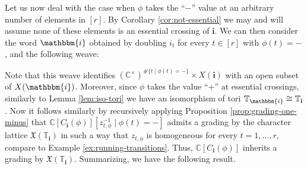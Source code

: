 \documentclass[a4paper, 11pt]{amsart}
\newcommand{\charlat}{\mathfrak{X}}
\newcommand{\word}[1]{\mathbf{#1}}
\newcommand{\wword}[1]{\mathbbm{#1}}
\newcommand{\C}{\mathbb{C}}
\newcommand{\dil}[1]{\mathbb{T}_{#1}}
\theoremstyle{definition}
\begin{document}
Let us now deal with the case when $\phi$ takes the ``$-$'' value at an arbitrary number of elements in $[r]$. By Corollary \ref{cor:not-essential} we may and will assume none of these elements is an essential crossing of $\word{i}$. We can then consider the word $\wword{i}$ obtained by doubling $i_t$ for every $t \in [r]$ with $\phi(t) = -$, and the following weave:

\begin{center}
\end{center}

Note that this weave identifies $(\C^{\times})^{\#\{t \mid \phi(t) = -\}} \times X(\word{i})$ with an open subset of $X(\wword{i})$. Moreover, since $\phi$ takes the value ``$+$'' at essential crossings, similarly to Lemma \ref{lem:iso-tori} we have an isomorphism of tori $\dil{\wword{i}} \cong \dil{\word{i}}$. Now it follows similarly by recursively applying Proposition \ref{prop:grading-one-minus} that $\C[C_{\word{i}}(\phi)][z_{t, \phi}^{-1} \mid \phi(t) = -]$ admits a grading by the character lattice $\charlat(\dil{\word{i}})$ in such a way that $z_{t, \phi}$ is homogeneous for every $t = 1, \dots, r$, compare to Example \ref{ex:running-transitions}. Thus, $\C[C_{\word{i}}(\phi)]$ inherits a grading by $\charlat(\dil{\word{i}})$. Summarizing, we have the following result.
\end{document}

